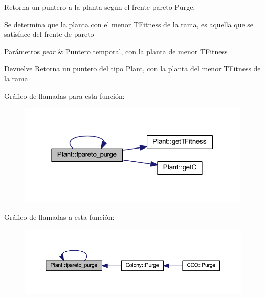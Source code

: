 Retorna un puntero a la planta segun el frente pareto Purge. 

Se determina que la planta con el menor T\+Fitness de la rama, es aquella que se satisface del frente de pareto


\begin{DoxyParams}{Parámetros}
{\em peor} & Puntero temporal, con la planta de menor T\+Fitness\\
\hline
\end{DoxyParams}
\begin{DoxyReturn}{Devuelve}
Retorna un puntero del tipo \hyperlink{class_plant}{Plant}, con la planta del menor T\+Fitness de la rama 
\end{DoxyReturn}


Gráfico de llamadas para esta función\+:
\nopagebreak
\begin{figure}[H]
\begin{center}
\leavevmode
\includegraphics[width=316pt]{class_plant_afbc29c83a69faf9bef5373b0be9e6771_cgraph}
\end{center}
\end{figure}




Gráfico de llamadas a esta función\+:
\nopagebreak
\begin{figure}[H]
\begin{center}
\leavevmode
\includegraphics[width=350pt]{class_plant_afbc29c83a69faf9bef5373b0be9e6771_icgraph}
\end{center}
\end{figure}


